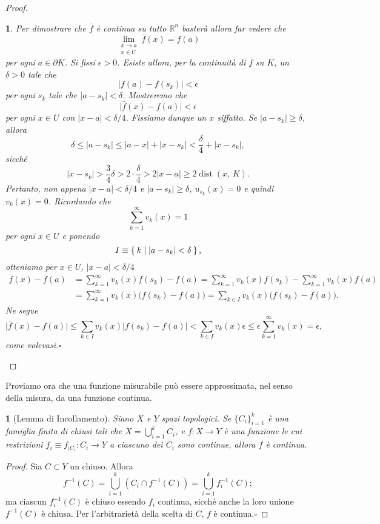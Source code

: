 \documentclass[a4paper,10pt,openright,oneside]{book}
\theoremstyle{theoremstyle}
\theoremstyle{theoremstylewoheader}
\newtheorem{teorema2}[teorema]{}
\theoremstyle{theoremstyle}
\theoremstyle{proofsecstyle}
\newtheorem{proofsec}{}
\theoremstyle{nonumberplain}
\newtheorem{proof}{Dim.}
\newcommand{\RR}{\ensuremath{\mathbb{R}}}
\newcommand{\abs}[1]{\ensuremath{\lvert #1 \rvert}}
\newcommand{\boundary}[1]{\ensuremath{\partial #1}}
\DeclareMathOperator{\dist}{dist}
\renewcommand{\qedsymbol}{\ensuremath{\square}}
\newcommand{\qed}{\unskip\nobreak\hfill\nobreak\hspace{.5em}\qedsymbol}
\begin{document}
\begin{proof}
\begin{proofsec}
Per dimostrare che $\bar{f}$ è continua su tutto $\RR^n$ basterà allora far vedere che
\[
\lim_{\substack{x \to a\\x \in U}} \bar{f}(x) = f(a)
\]
per ogni $a \in \boundary{K}$. Si fissi $\epsilon > 0$. Esiste allora, per la continuità di $f$ su $K$, un $\delta > 0$ tale che
\[
\abs{f(a) - f(s_k)} < \epsilon
\]
per ogni $s_k$ tale che $\abs{a - s_k} < \delta$. Mostreremo che
\[
\abs{\bar{f}(x) - f(a)} < \epsilon
\]
per ogni $x \in U$ con $\abs{x - a} < \delta/4$. Fissiamo dunque un $x$ siffatto. Se $\abs{a - s_k} \ge \delta$, allora
\[
\delta \le \abs{a - s_k} \le \abs{a - x} + \abs{x - s_k} < \frac{\delta}{4} + \abs{x - s_k},
\]
sicché
\[
\abs{x - s_k} > \frac{3}{4}\delta > 2 \cdot \frac{\delta}{4} > 2\abs{x - a} \ge 2\dist(x,\, K).
\]
Pertanto, non appena $\abs{x - a} < \delta/4$ e $\abs{a - s_k} \ge \delta$, $u_{s_k}(x) = 0$ e quindi $v_k(x) = 0$. Ricordando che
\[
\sum_{k=1}^\infty v_k(x) = 1
\]
per ogni $x \in U$ e ponendo
\[
I \equiv \Set{ k | \abs{a - s_k} < \delta },
\]
otteniamo per $x \in U$, $\abs{x - a} < \delta/4$
\begin{align*}
\bar{f}(x) - f(a) &= \sum_{k=1}^\infty v_k(x)f(s_k) - f(a) = \sum_{k=1}^\infty v_k(x)f(s_k) - \sum_{k=1}^\infty v_k(x)f(a)\\
&= \sum_{k=1}^\infty v_k(x)\Big(f(s_k) - f(a)\Big) = \sum_{k \in I} v_k(x)\Big(f(s_k) - f(a)\Big).
\end{align*}
Ne segue
\[
\abs{\bar{f}(x) - f(a)} \le \sum_{k \in I} v_k(x) \abs{f(s_k) - f(a)} < \sum_{k \in I} v_k(x) \epsilon \le \epsilon\sum_{k=1}^\infty v_k(x) = \epsilon,
\]
come volevasi.\qed
\end{proofsec}
\end{proof}

\noindent Proviamo ora che una funzione misurabile può essere approssimata, nel senso della misura, da una funzione continua.

\begin{teorema2}[Lemma di Incollamento]
\label{thm:lemma_incollamento}
Siano $X$ e $Y$ spazi topologici. Se $\{C_i\}_{i=1}^k$ è una famiglia \emph{finita} di chiusi tali che $X = \bigcup_{i=1}^k C_i$, e $f : X \rightarrow Y$ è una funzione le cui restrizioni $f_i \equiv f_{|C_i} : C_i \rightarrow Y$ a ciascuno dei $C_i$ sono continue, allora $f$ è continua. 
\end{teorema2}

\begin{proof}
Sia $C \subset Y$ un chiuso. Allora
\[
f^{-1}(C) = \bigcup_{i=1}^k (C_i \cap f^{-1}(C)) = \bigcup_{i=1}^k f_i^{-1}(C);
\]
ma ciascun $f_i^{-1}(C)$ è chiuso essendo $f_i$ continua, sicché anche la loro unione $f^{-1}(C)$ è chiusa. Per l'arbitrarietà della scelta di $C$, $f$ è continua.\qed
\end{proof}
\end{document}
